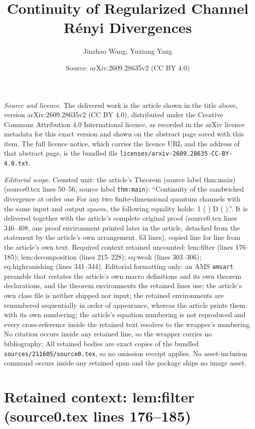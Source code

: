 \documentclass[10pt,a4paper]{amsart}
\title[Continuity of Regularized Channel R\'enyi Divergences]{Continuity of Regularized Channel R\'enyi Divergences}
\author{Jinzhao Wang, Yuxiang Yang}
\date{Source: arXiv:2609.28635v2 (CC BY 4.0)}
\theoremstyle{plain}
\begin{document}
\maketitle

\noindent\emph{Source and licence.} The delivered work is the article shown in the title above, version arXiv:2609.28635v2 (CC BY 4.0), distributed under the Creative Commons Attribution 4.0 International licence, as recorded in the arXiv licence metadata for this exact version and shown on the abstract page saved with this item. The full licence notice, which carries the licence URL and the address of that abstract page, is the bundled file \texttt{licenses/arxiv-2609.28635-CC-BY-4.0.txt}.
\par\smallskip

\noindent\textit{Editorial scope.} Counted unit: the article's Theorem (source label thm:main) (source0.tex lines 50--56, source label \texttt{thm:main}): ``Continuity of the sandwiched divergence at order one For any two finite-dimensional quantum channels with the same input and output spaces, the following equality holds: 1 ( ) D ( ).''. It is delivered together with the article's complete original proof (source0.tex lines 346--408, one proof environment printed later in the article, detached from the statement by the article's own arrangement, 63 lines), copied line for line from the article's own text. Required context retained uncounted: lem:filter (lines 176--185); lem:decomposition (lines 215--228); eq:weak (lines 303--306); eq:highvanishing (lines 341--344). Editorial formatting only: an AMS \texttt{amsart} preamble that restates the article's own macro definitions and its own theorem declarations, and the theorem environments the retained lines use; the article's own class file is neither shipped nor input; the retained environments are renumbered sequentially in order of appearance, whereas the article prints them with its own numbering; the article's equation numbering is not reproduced and every cross-reference inside the retained text resolves to the wrapper's numbering. No citation occurs inside any retained line, so the wrapper carries no bibliography; All retained bodies are exact copies of the bundled \texttt{sources/211605/source0.tex}, so no omission receipt applies. No asset-inclusion command occurs inside any retained span and the package ships no image asset.


\section*{Retained context: lem:filter (source0.tex lines 176--185)}
\end{document}

